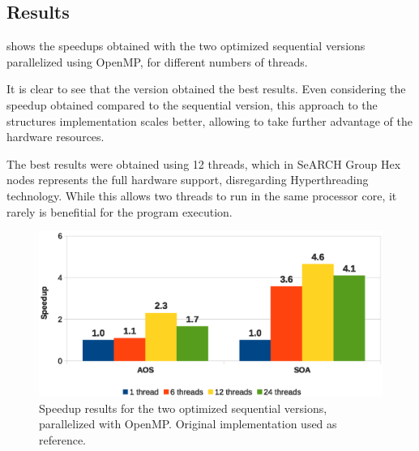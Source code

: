 \subsection{Results}


 shows the speedups obtained with the two optimized sequential versions parallelized using OpenMP, for different numbers of threads.

It is clear to see that the \soa version obtained the best results. Even considering the speedup obtained compared to the sequential \aos version, this approach to the structures implementation scales better, allowing to take further advantage of the hardware resources.

The best results were obtained using 12 threads, which in SeARCH Group Hex nodes represents the full hardware support, disregarding \intel Hyperthreading technology. While this allows two threads to run in the same processor core, it rarely is benefitial for the program execution.

\begin{figure}[!htp]
	\centering
	\includegraphics[width=\columnwidth]{images/graph_comparison_omp.eps}
	\caption{}
	\caption{Speedup results for the two optimized sequential versions, parallelized with OpenMP. Original implementation used as reference.}
	\label{fig:results:omp}
\end{figure}